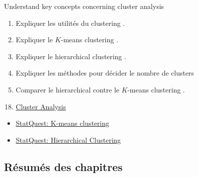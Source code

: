 \documentclass[12pt, titlepage, french]{report}
\begin{document}
\begin{distributions}[Objective]
Understand key concepts concerning cluster analysis
\end{distributions}

\begin{outcomes}
\begin{enumerate}
	\item	Expliquer les utilités du \og clustering \fg{}.
	\item	Expliquer le \og $K$-means clustering \fg{}.
	\item	Expliquer le \og hierarchical clustering \fg{}.
	\item	Expliquer les méthodes pour décider le nombre de \og clusters \fg{} 
	\item	Comparer le \og hierarchical \fg{} contre le \og $K$-means clustering \fg{}.
\end{enumerate}
\end{outcomes}

\begin{ASM_chapter}
\begin{enumerate}
  \setcounter{enumi}{17}
	\item	\hyperref[CLUSTERS]{Cluster Analysis}
\end{enumerate}
\end{ASM_chapter}

\begin{YTB_vids}
\begin{itemize}
	\item	\href{https://www.youtube.com/watch?v=4b5d3muPQmA&list=PLblh5JKOoLUICTaGLRoHQDuF_7q2GfuJF&index=32}{StatQuest: K-means clustering}
	\item	\href{https://www.youtube.com/watch?v=7xHsRkOdVwo&list=PLblh5JKOoLUICTaGLRoHQDuF_7q2GfuJF&index=31}{StatQuest: Hierarchical Clustering}
\end{itemize}
\end{YTB_vids}

\subsection{Résumés des chapitres}
\end{document}
